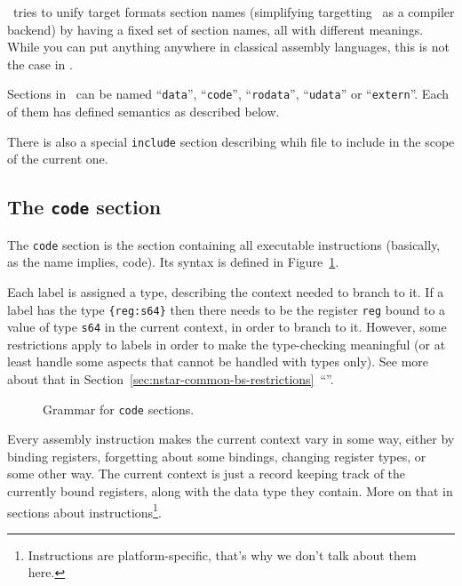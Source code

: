 \nstar\ tries to unify target formats section names (simplifying targetting \nstar\ as a compiler backend) by having a fixed set of section names, all with different meanings. While you can put anything anywhere in classical assembly languages, this is not the case in \nstar.

Sections in \nstar\ can be named ``\texttt{data}'', ``\texttt{code}'', ``\texttt{rodata}'', ``\texttt{udata}'' or ``\texttt{extern}''. Each of them has defined semantics as described below.

There is also a special \texttt{include} section describing whih file to include in the scope of the current one.

\subsection{The \texttt{code} section}\label{subsec:nstar-common-sections-code}

The \texttt{code} section is the section containing all executable instructions (basically, as the name implies, code).
Its syntax is defined in Figure~\ref{fig:nstar-common-sections-code-grammar}.

Each label is assigned a type, describing the context needed to branch to it.
If a label has the type \texttt{\{reg:s64\}} then there needs to be the register \texttt{reg} bound to a value of type \texttt{s64} in the current context, in order to branch to it.
However, some restrictions apply to labels in order to make the type-checking meaningful (or at least handle some aspects that cannot be handled with types only). See more about that in Section~\ref{sec:nstar-common-bs-restrictions}~``''.

\begin{figure}[htb]
	\centering


	\caption{Grammar for \texttt{code} sections.}
	\label{fig:nstar-common-sections-code-grammar}
\end{figure}

Every assembly instruction makes the current context vary in some way, either by binding registers, forgetting about some bindings, changing register types, or some other way. The current context is just a record keeping track of the currently bound registers, along with the data type they contain.
More on that in sections about instructions\footnote{Instructions are platform-specific, that's why we don't talk about them here.}.

